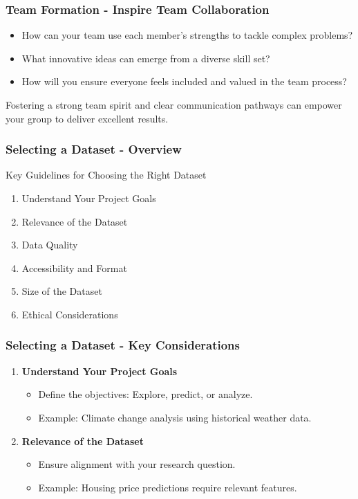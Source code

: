\documentclass[aspectratio=169]{beamer}
\begin{document}
\begin{frame}[fragile]
    \frametitle{Team Formation - Inspire Team Collaboration}
    \begin{itemize}
        \item How can your team use each member's strengths to tackle complex problems?
        \item What innovative ideas can emerge from a diverse skill set?
        \item How will you ensure everyone feels included and valued in the team process?
    \end{itemize}
    Fostering a strong team spirit and clear communication pathways can empower your group to deliver excellent results.
\end{frame}

\begin{frame}[fragile]
    \frametitle{Selecting a Dataset - Overview}
    \begin{block}{Key Guidelines for Choosing the Right Dataset}
        \begin{enumerate}
            \item Understand Your Project Goals
            \item Relevance of the Dataset
            \item Data Quality
            \item Accessibility and Format
            \item Size of the Dataset
            \item Ethical Considerations
        \end{enumerate}
    \end{block}
\end{frame}

\begin{frame}[fragile]
    \frametitle{Selecting a Dataset - Key Considerations}
    \begin{enumerate}
        \item \textbf{Understand Your Project Goals}
            \begin{itemize}
                \item Define the objectives: Explore, predict, or analyze.
                \item Example: Climate change analysis using historical weather data.
            \end{itemize}
        \item \textbf{Relevance of the Dataset}
            \begin{itemize}
                \item Ensure alignment with your research question.
                \item Example: Housing price predictions require relevant features.
            \end{itemize}
    \end{enumerate}
\end{frame}
\end{document}
